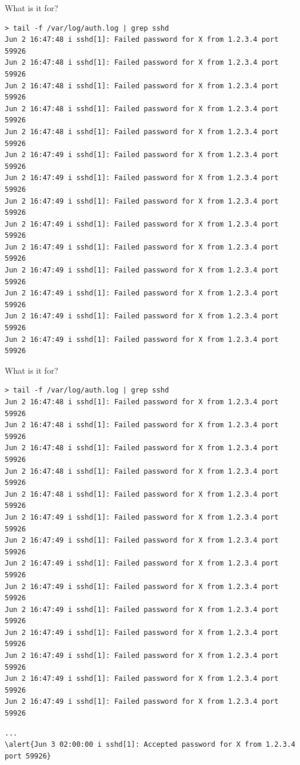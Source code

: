 \documentclass[]{beamer}
\begin{document}
\begin{frame}[t,fragile]{What is it for?}
\begin{Verbatim}[commandchars=\\\{\},fontsize=\scriptsize]
> tail -f /var/log/auth.log | grep sshd
Jun 2 16:47:48 i sshd[1]: Failed password for X from 1.2.3.4 port 59926
Jun 2 16:47:48 i sshd[1]: Failed password for X from 1.2.3.4 port 59926
Jun 2 16:47:48 i sshd[1]: Failed password for X from 1.2.3.4 port 59926
Jun 2 16:47:48 i sshd[1]: Failed password for X from 1.2.3.4 port 59926
Jun 2 16:47:48 i sshd[1]: Failed password for X from 1.2.3.4 port 59926
Jun 2 16:47:49 i sshd[1]: Failed password for X from 1.2.3.4 port 59926
Jun 2 16:47:49 i sshd[1]: Failed password for X from 1.2.3.4 port 59926
Jun 2 16:47:49 i sshd[1]: Failed password for X from 1.2.3.4 port 59926
Jun 2 16:47:49 i sshd[1]: Failed password for X from 1.2.3.4 port 59926
Jun 2 16:47:49 i sshd[1]: Failed password for X from 1.2.3.4 port 59926
Jun 2 16:47:49 i sshd[1]: Failed password for X from 1.2.3.4 port 59926
Jun 2 16:47:49 i sshd[1]: Failed password for X from 1.2.3.4 port 59926
Jun 2 16:47:49 i sshd[1]: Failed password for X from 1.2.3.4 port 59926
Jun 2 16:47:49 i sshd[1]: Failed password for X from 1.2.3.4 port 59926
\end{Verbatim}

\end{frame}


\begin{frame}[t,fragile]{What is it for?}
\begin{Verbatim}[commandchars=\\\{\},fontsize=\scriptsize]
> tail -f /var/log/auth.log | grep sshd
Jun 2 16:47:48 i sshd[1]: Failed password for X from 1.2.3.4 port 59926
Jun 2 16:47:48 i sshd[1]: Failed password for X from 1.2.3.4 port 59926
Jun 2 16:47:48 i sshd[1]: Failed password for X from 1.2.3.4 port 59926
Jun 2 16:47:48 i sshd[1]: Failed password for X from 1.2.3.4 port 59926
Jun 2 16:47:48 i sshd[1]: Failed password for X from 1.2.3.4 port 59926
Jun 2 16:47:49 i sshd[1]: Failed password for X from 1.2.3.4 port 59926
Jun 2 16:47:49 i sshd[1]: Failed password for X from 1.2.3.4 port 59926
Jun 2 16:47:49 i sshd[1]: Failed password for X from 1.2.3.4 port 59926
Jun 2 16:47:49 i sshd[1]: Failed password for X from 1.2.3.4 port 59926
Jun 2 16:47:49 i sshd[1]: Failed password for X from 1.2.3.4 port 59926
Jun 2 16:47:49 i sshd[1]: Failed password for X from 1.2.3.4 port 59926
Jun 2 16:47:49 i sshd[1]: Failed password for X from 1.2.3.4 port 59926
Jun 2 16:47:49 i sshd[1]: Failed password for X from 1.2.3.4 port 59926
Jun 2 16:47:49 i sshd[1]: Failed password for X from 1.2.3.4 port 59926
\end{Verbatim}

\begin{Verbatim}[commandchars=\\\{\},fontsize=\scriptsize]
...
\alert{Jun 3 02:00:00 i sshd[1]: Accepted password for X from 1.2.3.4 port 59926}
\end{Verbatim}
\end{frame}
\end{document}

